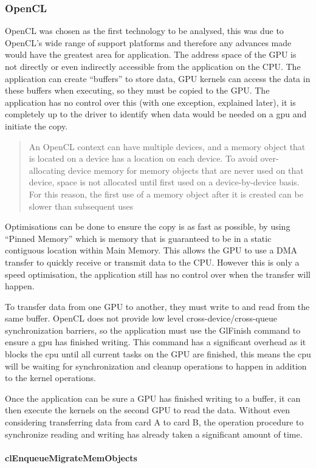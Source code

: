 \documentclass[12pt,a4paper]{article}
\begin{document}
\subsubsection{OpenCL}
OpenCL was chosen as the first technology to be analysed, this was due to OpenCL’s wide range of support platforms and therefore any advances made would have the greatest area for application. The address space of the GPU is not directly or even indirectly accessible from the application on the CPU.
The application can create “buffers” to store data, GPU kernels can access the data in these buffers when executing, so they must be copied to the GPU. The application has no control over this (with one exception, explained later), it is completely up to the driver to identify when data would be needed on a gpu and initiate the copy.
\blockquote[\cite{amdoclguide}]{An OpenCL context can have multiple devices, and a memory object that is located on a device has a location on each device. To avoid over-allocating device memory for memory objects that are never used on that device, space is not allocated until first used on a device-by-device basis. For this reason, the first use of a memory object after it is created can be slower than subsequent uses
}
Optimisations can be done to ensure the copy is as fast as possible, by using “Pinned Memory” which is memory that is guaranteed to be in a static contiguous location within Main Memory. This allows the GPU to use a DMA transfer to quickly receive or transmit data to the CPU. However this is only a speed optimisation, the application still has no control over when the transfer will happen.

To transfer data from one GPU to another, they must write to and read from the same buffer. OpenCL does not provide low level cross-device/cross-queue synchronization barriers, so the application must use the GlFinish command to ensure a gpu has finished writing. This command has a significant overhead as it blocks the cpu until all current tasks on the GPU are finished, this means the cpu will be waiting for synchronization and cleanup operations to happen in addition to the kernel operations. 

Once the application can be sure a GPU has finished writing to a buffer, it can then execute the kernels on the second GPU to read the data. Without even considering transferring data from card A to card B, the operation procedure to synchronize reading and writing has already taken a significant amount of time. 

\paragraph{clEnqueueMigrateMemObjects}
\end{document}
